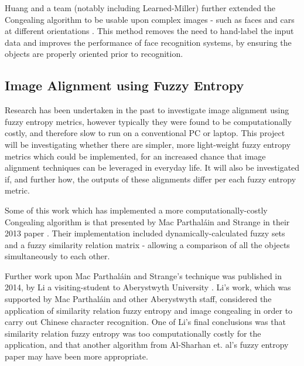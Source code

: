 Huang and a team (notably including Learned-Miller) further extended the \Gls{Congealing} algorithm to be usable upon complex images - such as faces and cars at different orientations \cite{Huang_Jain_Learned-Miller_2007}. This method removes the need to hand-label the input data and improves the performance of face recognition systems, by ensuring the objects are properly oriented prior to recognition.

\subsection{Image Alignment using Fuzzy Entropy}

Research has been undertaken in the past to investigate image alignment using fuzzy entropy metrics, however typically they were found to be computationally costly, and therefore slow to run on a conventional PC or laptop. This project will be investigating whether there are simpler, more light-weight fuzzy entropy metrics which could be implemented, for an increased chance that image alignment techniques can be leveraged in everyday life. It will also be investigated if, and further how, the outputs of these alignments differ per each fuzzy entropy metric.

Some of this work which has implemented a more computationally-costly \Gls{Congealing} algorithm is that presented by Mac Parthal\'ain and Strange in their 2013 paper  \cite{Mac_Parthalain_Strange_2013}.  Their implementation included dynamically-calculated fuzzy sets and a fuzzy similarity relation matrix - allowing a comparison of all the objects simultaneously to each other.

Further work upon Mac Parthal\'ain and Strange's technique was published in 2014, by Li a visiting-student to Aberystwyth University \cite{Li_Shen_Li_Parthaláin_2014}. Li's work, which was supported by Mac Parthal\'ain and other Aberystwyth staff, considered the application of similarity relation fuzzy entropy and image congealing in order to carry out Chinese character recognition. One of Li's final conclusions was that similarity relation fuzzy entropy was too computationally costly for the application, and that another algorithm from Al-Sharhan et. al's fuzzy entropy paper \cite{Al-Sharhan_Karray_Gueaieb_Basir_2001} may have been more appropriate.
